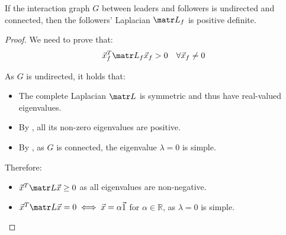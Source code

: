 \begin{lemma} \label{th:laplacian_positive_definite}
    If the interaction graph $G$ between leaders and followers is undirected and connected, then the followers' Laplacian $\lap_f$ is positive definite.
    
    \begin{proof}
        We need to prove that:
        \[ \x_f^T \lap_f \x_f > 0 \quad \forall \x_f \neq 0 \]

        As $G$ is undirected, it holds that:
        \begin{itemize}
            \item The complete Laplacian $\lap$ is symmetric and thus have real-valued eigenvalues.
            \item By , all its non-zero eigenvalues are positive.
            \item By , as $G$ is connected, the eigenvalue $\lambda=0$ is simple.
        \end{itemize}
        Therefore:
        \begin{itemize}
            \item $\x^T \lap \x \geq 0$ as all eigenvalues are non-negative.
            \item $\x^T \lap \x = 0 \iff \vec{x} = \alpha\vec{1}$ for $\alpha \in \mathbb{R}$, as $\lambda=0$ is simple.
        \end{itemize}


\end{proof}
\end{lemma}

